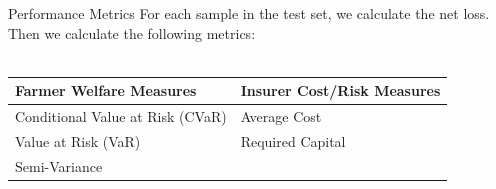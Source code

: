 \documentclass{beamer}
\begin{document}
\begin{frame}{Performance Metrics}
    For each sample in the test set, we calculate the net loss. Then we calculate the following metrics: 
    \\~~\\
    \begin{table}
        \centering
        \begin{tabular}{|l|l|}
            \hline
            \textbf{Farmer Welfare Measures} & \textbf{Insurer Cost/Risk Measures} \\ \hline
            Conditional Value at Risk (CVaR) & Average Cost                        \\
            Value at Risk (VaR)              & Required Capital                    \\
            Semi-Variance                    &                                     \\ \hline
            \end{tabular}
    \end{table}
\end{frame}
\end{document}
